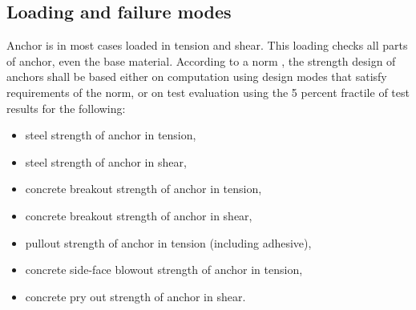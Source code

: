 \subsection{Loading and failure modes}
Anchor is in most cases loaded in tension and shear. This loading checks all parts of anchor, even the base material. According to a norm \cite{anchors-ACI-318M}, the strength design of anchors shall be based either on computation using design modes that satisfy requirements of the norm, or on test evaluation using the 5 percent fractile of test results for the following:

\begin{itemize}
	\item steel strength of anchor in tension,
	\item steel strength of anchor in shear, 
	\item concrete breakout strength of anchor in tension,
	\item concrete breakout strength of anchor in shear,
	\item pullout strength of anchor in tension (including adhesive), 
	\item concrete side-face blowout strength of anchor in tension,
	\item concrete pry out strength of anchor in shear.
\end{itemize} 

